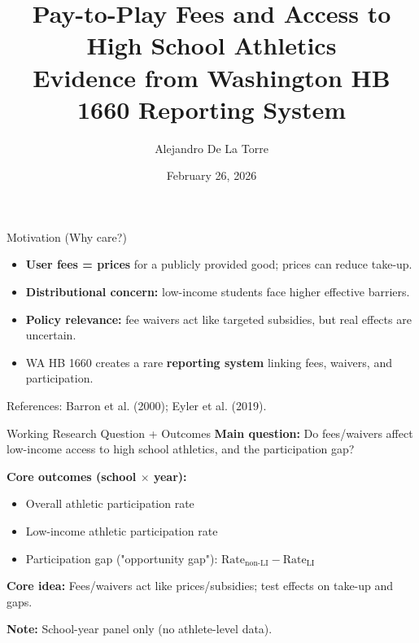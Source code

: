 \documentclass[11pt]{beamer}
\title{Pay-to-Play Fees and Access to High School Athletics\\\small Evidence from Washington HB 1660 Reporting System}
\author{Alejandro De La Torre}
\institute{ECON 580: Project Design}
\date{February 26, 2026}
\begin{document}
\begin{frame}
  \titlepage
\end{frame}

\begin{frame}{Motivation (Why care?)}
\begin{itemize}
  \item \textbf{User fees = prices} for a publicly provided good; prices can reduce take-up.
  \item \textbf{Distributional concern:} low-income students face higher effective barriers.
  \item \textbf{Policy relevance:} fee waivers act like targeted subsidies, but real effects are uncertain.
  \item WA HB 1660 creates a rare \textbf{reporting system} linking fees, waivers, and participation.
\end{itemize}
\vspace{0.25em}
{\tiny References: Barron et al. (2000); Eyler et al. (2019).}
\end{frame}

\begin{frame}{Working Research Question + Outcomes}
\textbf{Main question:} Do fees/waivers affect low-income access to high school athletics, and the participation gap?

\vspace{0.5em}
\textbf{Core outcomes (school $\times$ year):}
\begin{itemize}
  \item Overall athletic participation rate
  \item Low-income athletic participation rate
  \item Participation gap ("opportunity gap"): \; $\text{Rate}_{\text{non-LI}} - \text{Rate}_{\text{LI}}$
\end{itemize}

\vspace{0.5em}
\textbf{Core idea:} Fees/waivers act like prices/subsidies; test effects on take-up and gaps.

\vspace{0.25em}
\textbf{Note:} School-year panel only (no athlete-level data).
\end{frame}
\end{document}
